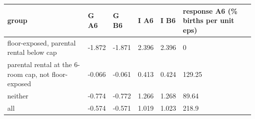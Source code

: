 \begingroup\small
\setlength{\tabcolsep}{3pt}
\renewcommand{\arraystretch}{1.04}
\begin{tabularx}{\linewidth}{XXXXXX}
\toprule
group & G A6 & G B6 & I A6 & I B6 & response A6 (\% births per unit eps) \\
\midrule
floor-exposed, parental rental below cap & -1.872 & -1.871 & 2.396 & 2.396 & 0 \\
parental rental at the 6-room cap, not floor-exposed & -0.066 & -0.061 & 0.413 & 0.424 & 129.25 \\
neither & -0.774 & -0.772 & 1.266 & 1.268 & 89.64 \\
all & -0.574 & -0.571 & 1.019 & 1.023 & 218.9 \\
\bottomrule
\end{tabularx}
\endgroup

